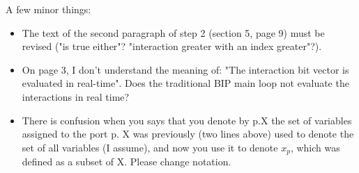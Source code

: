A few minor things:

\begin{itemize}
\item The text of the second paragraph of step 2 (section 5, page 9) must be
revised ("is true either"? "interaction greater with an index greater"?).

\item On page 3, I don't understand the meaning of: "The interaction bit vector is
evaluated in real-time". Does the traditional BIP main loop not evaluate the
interactions in real time?

\item There is confusion when you says that you denote by p.X the set of variables
assigned to the port p. X was previously (two lines above) used to denote
the set of all variables (I assume), and now you use it to denote $x_p$, which
was defined as a subset of X. Please change notation.
\end{itemize}



